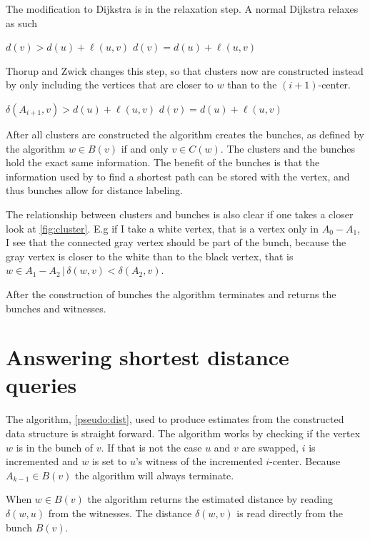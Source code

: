 The modification to Dijkstra is in the relaxation step. A normal Dijkstra
relaxes as such
\begin{codebox}
    \li \If $d(v) > d(u) + \ell(u,v)$
    \li     \Do
            $d(v) = d(u) + \ell(u,v)$
            \End
\end{codebox}
Thorup and Zwick changes this step, so that clusters now are constructed
instead by only including the vertices that are closer to $w$ than to the
$(i+1)$-center.
\begin{codebox}
    \li \If $\delta(A_{i+1},v) > d(u) + \ell(u,v)$
    \li     \Do
            $d(v) = d(u) + \ell(u,v)$
            \End
\end{codebox}
After all clusters are constructed the algorithm creates the bunches, as
defined by the algorithm $w \in B(v)$ if and only $v \in C(w)$. The clusters
and the bunches hold the exact same information. The benefit of the bunches
is that the information used by  to find a shortest path can be
stored with the vertex, and thus bunches allow for distance labeling.

The relationship between clusters and bunches is also clear if one takes a
closer look at \autoref{fig:cluster}. E.g if I take a white vertex, that is
a vertex only in $A_0-A_1$, I see that the connected gray vertex should be
part of the bunch, because the gray vertex is closer to the white than to the
black vertex, that is $w \in A_1 - A_2 \,|\, \delta(w,v) < \delta(A_2,v)$.

After the construction of bunches the algorithm terminates and returns the
bunches and witnesses.

\section{Answering shortest distance queries}
The algorithm, \autoref{pseudo:dist}, used to produce estimates from the
constructed data structure is straight forward. The algorithm works by
checking if the vertex $w$ is in the bunch of $v$. If that is not the case $u$
and $v$ are swapped, $i$ is incremented and $w$ is set to $u$'s witness of the
incremented $i$-center. Because $A_{k-1} \in B(v)$ the algorithm will always
terminate.

When $w \in B(v)$ the algorithm returns the estimated distance by reading
$\delta(w,u)$ from the witnesses. The distance $\delta(w,v)$ is read directly
from the bunch $B(v)$.

